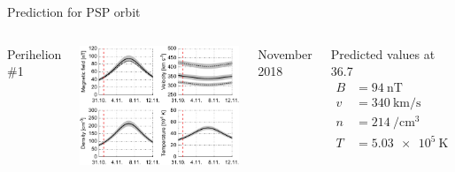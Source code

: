 \begin{frame}[plain,c]{Prediction for PSP orbit}{}
	\begin{columns}[c]
		
		\centering
		Perihelion \#1\\\ 
		
		\includegraphics[width=\textwidth]{../talk_figures/SPP_perihelia_prediction_f_defense.pdf}
		
		
		November 2018

		
		\begin{block}{\centering Predicted values at 36.7~\Rs}
			\begin{align*}
				B &= \SI{94}{\nano\tesla}\\
				v &= \SI{340}{\km\per\s}\\
				n &= \SI{214}{\per\cm\cubed}\\
				T &= \SI{5.03e5}{\kelvin}
			\end{align*}
		\end{block}
	
	\end{columns}
\end{frame}
